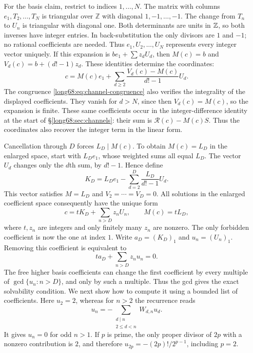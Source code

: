 \documentclass[11pt]{article}
\newcommand{\Lc}{L}
\begin{document}
For the basis claim, restrict to indices $1,\ldots,N$. The matrix with
columns $e_1,T_2,\ldots,T_N$ is triangular over $\mathbb Z$ with
diagonal $1,-1,\ldots,-1$. The change from $T_n$ to $U_n$ is
triangular with diagonal one. Both determinants are units in $\mathbb{Z}$,
so both inverses have integer entries. In back-substitution the only
divisors are $1$ and $-1$; no rational coefficients are needed.
Thus $e_1,U_2,\ldots,U_N$ represents every integer vector uniquely.
If this expansion is $b e_1+\sum z_dU_d$, then $M(c)=b$ and
$V_d(c)=b+(d!-1)z_d$. These identities determine the coordinates:
\[
 c=M(c)e_1+\sum_{d\ge2}\frac{V_d(c)-M(c)}{d!-1}U_d.
\]
The congruence \eqref{long68:eq:channel-congruence} also verifies the
integrality of the displayed coefficients. They vanish for $d>N$,
since then $V_d(c)=M(c)$, so the expansion is finite. These same
coefficients occur in the integer-difference identity at the start of
\S\ref{long68:sec:channels}: their sum is $\mathcal R(c)-M(c)S$.
Thus the coordinates also recover the integer term in the linear form.

Cancellation through $D$ forces $\Lc_D\mid M(c)$. To obtain
$M(c)=\Lc_D$ in the enlarged space, start with $\Lc_De_1$, whose weighted
sums all equal $\Lc_D$. The vector $U_d$ changes only the $d$th sum,
by $d!-1$. Hence define
\[
 K_D=\Lc_De_1-\sum_{d=2}^D\frac{\Lc_D}{d!-1}U_d.
\]
This vector satisfies $M=\Lc_D$ and $V_2=\cdots=V_D=0$.
All solutions in the enlarged coefficient space consequently have the
unique form
\begin{equation}\label{long68:eq:low-channel-basis}
 c=tK_D+\sum_{n>D}z_nU_n,\qquad M(c)=tL_D,
\end{equation}
where $t,z_n$ are integers and only finitely many $z_n$ are nonzero.
The only forbidden coefficient is now the one at index $1$.
Write $a_D=(K_D)_1$ and $u_n=(U_n)_1$. Removing this coefficient
is equivalent to
\begin{equation}\label{long68:eq:low-channel-support}
 ta_D+\sum_{n>D}z_nu_n=0.
\end{equation}
The free higher basis coefficients can change the first coefficient by every
multiple of $\gcd\{u_n:n>D\}$, and only by such a multiple. Thus the
gcd gives the exact solvability condition. We next show how to compute
it using a bounded list of coefficients.
Here $u_2=2$, whereas for $n>2$ the recurrence reads
\[
 u_n=-\sum_{\substack{d\mid n\\2\le d<n}}W_{d,n}u_d.
\]
It gives $u_n=0$ for odd $n>1$. If $p$ is prime, the only proper divisor
of $2p$ with a nonzero contribution is $2$, and therefore
$u_{2p}=-(2p)!/2^{p-1}$, including $p=2$.
\end{document}
